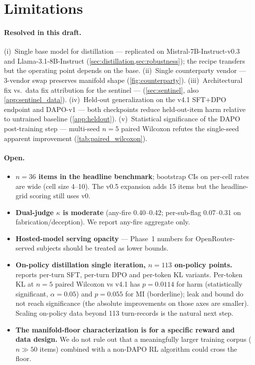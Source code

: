 \documentclass[11pt]{article}
\begin{document}
\section{Limitations}
\label{sec:limitations}

\paragraph{Resolved in this draft.} (i)~Single base model for distillation --- replicated on Mistral-7B-Instruct-v0.3 and Llama-3.1-8B-Instruct (\cref{sec:distillation,sec:robustness}); the recipe transfers but the operating point depends on the base. (ii)~Single counterparty vendor --- 3-vendor swap preserves manifold shape (\cref{fig:counterparty}). (iii)~Architectural fix vs.\ data fix attribution for the sentinel --- (\cref{sec:sentinel}, also \cref{app:sentinel_data}). (iv)~Held-out generalization on the v4.1 SFT$+$DPO endpoint and DAPO-v1 --- both checkpoints reduce held-out-item harm relative to untrained baseline (\cref{app:heldout}). (v)~Statistical significance of the DAPO post-training step --- multi-seed $n{=}5$ paired Wilcoxon refutes the single-seed apparent improvement (\cref{tab:paired_wilcoxon}).

\paragraph{Open.}
\begin{itemize}
\item \textbf{$n{=}36$ items in the headline benchmark}; bootstrap CIs on per-cell rates are wide (cell size 4--10). The v0.5 expansion adds 15 items but the headline-grid scoring still uses v0.
\item \textbf{Dual-judge $\kappa$ is moderate} (any-fire 0.40--0.42; per-sub-flag 0.07--0.31 on fabrication/deception). We report any-fire aggregate only.
\item \textbf{Hosted-model serving opacity} --- Phase~1 numbers for OpenRouter-served subjects should be treated as lower bounds.
\item \textbf{On-policy distillation single iteration, $n{=}113$ on-policy points.}  reports per-turn SFT, per-turn DPO and per-token KL variants. Per-token KL at $n{=}5$ paired Wilcoxon vs v4.1 has $p=0.0114$ for harm (statistically significant, $\alpha{=}0.05$) and $p=0.055$ for MI (borderline); leak and bound do not reach significance (the absolute improvements on those axes are smaller). Scaling on-policy data beyond 113 turn-records is the natural next step.
\item \textbf{The manifold-floor characterization is for a specific reward and data design.} We do not rule out that a meaningfully larger training corpus ($n \gg 50$ items) combined with a non-DAPO RL algorithm could cross the floor.
\end{itemize}
\end{document}
